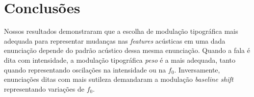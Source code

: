 \documentclass[11pt]{article}
\begin{document}
\section{Conclus\~{o}es}
  \label{sec:conclusoes}
  
  Nossos resultados demonstraram que a escolha de modulação tipográfica mais adequada para representar mudanças nas {\itshape features} acústicas em uma dada enunciação depende do padrão acústico dessa mesma enunciação. Quando a fala é dita com intensidade, a modulação tipográfica {\itshape peso} é a mais adequada, tanto quando representando oscilações na intensidade ou na $f_0$. Inversamente, enunciações ditas com mais sutileza demandaram a modulação {\itshape baseline shift} representando variações de $f_0$.

  

   
\end{document}
